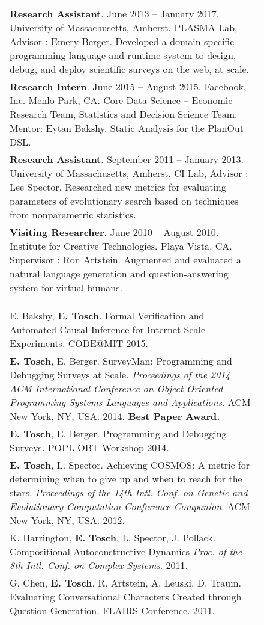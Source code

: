 \documentclass[10pt]{article}
\def \boxwidth {6in}
\newcommand{\cvsec}[2]{
	\begin{figure*}
		\begin{subfigure}[t]{1in}
			\sc{#1} 
		\end{subfigure}
		\begin{subfigure}[t]{6in}
		\vspace{-13px}
		    \begin{longtable}[t]{p{\boxwidth}}
                #2
            \end{longtable}
		\end{subfigure}
	\end{figure*}
}
\begin{document}
\cvsec{Research \newline Experience}{
		{\bf Research Assistant}. June 2013 -- January 2017. University of Massachusetts, Amherst. PLASMA Lab, Advisor : Emery Berger. Developed a domain specific programming language and runtime system
to design, debug, and deploy scientific surveys on the web, at scale.\\

{\bf Research Intern}. June 2015 -- August 2015. Facebook, Inc. Menlo Park, CA. Core Data Science -- Economic Research Team, Statistics and Decision Science Team. Mentor: Eytan Bakshy. Static Analysis for the PlanOut DSL. \\

		{\bf Research Assistant}. September 2011 -- January 2013. University of Massachusetts, Amherst. CI Lab, Advisor : Lee Spector. Researched new metrics for evaluating parameters of evolutionary
search based on techniques from nonparametric statistics.\\

		{\bf Visiting Researcher}. June 2010 -- August 2010. Institute for Creative Technologies. Playa Vista, CA. Supervisor : Ron Artstein. Augmented and evaluated a natural language generation and
question-answering system for virtual humans.
}

\cvsec{Publications}{
		E. Bakshy, {\bf E. Tosch}. Formal Verification and Automated Causal Inference for Internet-Scale Experiments. CODE@MIT 2015.\\
		
        {\bf E. Tosch}, E. Berger. SurveyMan: Programming and Debugging Surveys at Scale. \emph{Proceedings of the 2014 ACM International Conference on Object Oriented Programming Systems Languages and Applications}. ACM New York, NY, USA. 2014. {\bf Best Paper Award.}\\
        
        {\bf E. Tosch}, E. Berger. Programming and Debugging Surveys. POPL OBT Workshop 2014.\\
      
		{\bf E. Tosch}, L. Spector. Achieving COSMOS: A metric for determining when to give up and when to reach for the stars. \emph{Proceedings of the 14th Intl. Conf. on Genetic and Evolutionary Computation Conference Companion}. ACM New York, NY, USA. 2012.\\
	K. Harrington, {\bf E. Tosch}, L. Spector, J. Pollack. Compositional Autoconstructive Dynamics \emph{Proc. of the 8th Intl. Conf. on Complex Systems}. 2011.\\
	
	G. Chen, {\bf E. Tosch}, R. Artstein, A. Leuski, D. Traum. Evaluating Conversational Characters Created through Question Generation. FLAIRS Conference. 2011.
}
\end{document}
